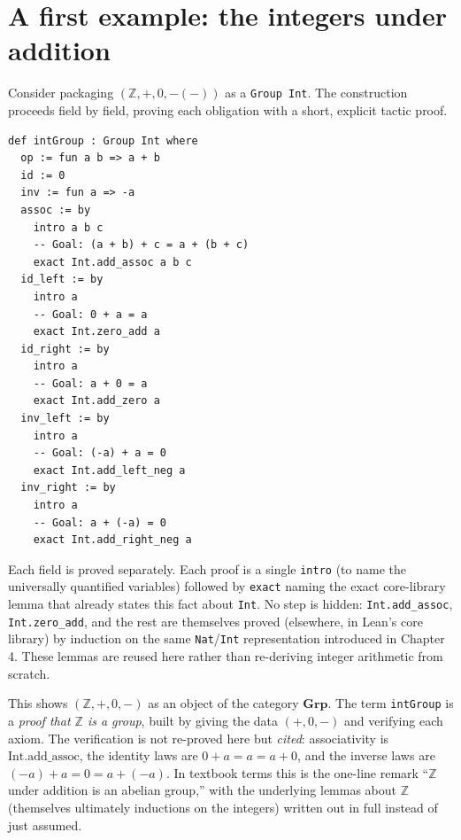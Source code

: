 \section{A first example: the integers under addition}\label{sec:06-groups:03-integers-example:1}

Consider packaging \((\mathbb{Z}, +, 0, -(-))\) as a \texttt{Group Int}. The construction proceeds field by field, proving each obligation with a short, explicit tactic proof.

\begin{lstlisting}
def intGroup : Group Int where
  op := fun a b => a + b
  id := 0
  inv := fun a => -a
  assoc := by
    intro a b c
    -- Goal: (a + b) + c = a + (b + c)
    exact Int.add_assoc a b c
  id_left := by
    intro a
    -- Goal: 0 + a = a
    exact Int.zero_add a
  id_right := by
    intro a
    -- Goal: a + 0 = a
    exact Int.add_zero a
  inv_left := by
    intro a
    -- Goal: (-a) + a = 0
    exact Int.add_left_neg a
  inv_right := by
    intro a
    -- Goal: a + (-a) = 0
    exact Int.add_right_neg a
\end{lstlisting}

Each field is proved separately. Each proof is a single \texttt{intro} (to name the universally quantified variables) followed by \texttt{exact} naming the exact core-library lemma that already states this fact about \texttt{Int}. No step is hidden: \texttt{Int.add\_\allowbreak{}assoc}, \texttt{Int.zero\_\allowbreak{}add}, and the rest are themselves proved (elsewhere, in Lean's core library) by induction on the same \texttt{Nat}/\texttt{Int} representation introduced in Chapter 4. These lemmas are reused here rather than re-deriving integer arithmetic from scratch.

\begin{mathreading}

This shows \((\mathbb{Z}, +, 0, -)\) as an object of the category \(\mathbf{Grp}\). The term \texttt{intGroup} is a \emph{proof that \(\mathbb{Z}\) is a group}, built by giving the data \((+, 0, -)\) and verifying each axiom. The verification is not re-proved here but \emph{cited}: associativity is \(\mathrm{Int.add\_assoc}\), the identity laws are \(0 + a = a
= a + 0\), and the inverse laws are \((-a) + a = 0 = a + (-a)\). In textbook terms this is the one-line remark ``\(\mathbb{Z}\) under addition is an abelian group,'' with the underlying lemmas about \(\mathbb{Z}\) (themselves ultimately inductions on the integers) written out in full instead of just assumed.

\end{mathreading}

